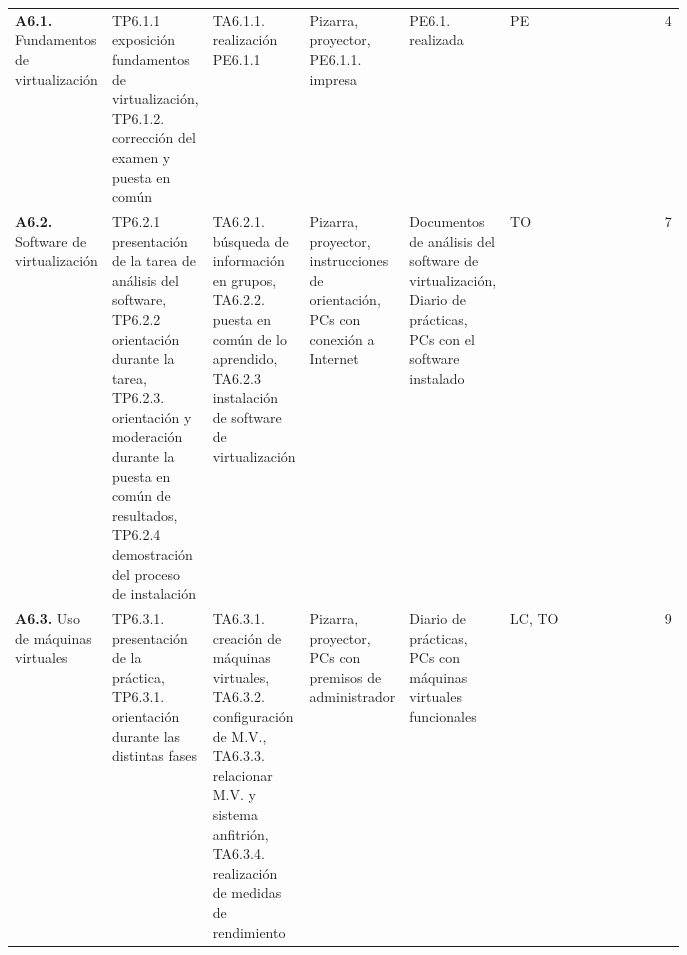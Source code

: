 \begin{landscape}
\begin{tabularx}{\linewidth}{p{0.13\linewidth} p{0.13\linewidth} p{0.13\linewidth} p{0.13\linewidth} p{0.13\linewidth} p{0.13\linewidth} r}
        \textbf{A6.1.} Fundamentos de virtualización & TP6.1.1 exposición fundamentos de virtualización, TP6.1.2. corrección del examen y puesta en común & TA6.1.1. realización PE6.1.1  & Pizarra, proyector, PE6.1.1. impresa & PE6.1. realizada & PE & 4 \\
        \textbf{A6.2.} Software de virtualización & TP6.2.1 presentación de la tarea de análisis del software, TP6.2.2 orientación durante la tarea, TP6.2.3. orientación y moderación durante la puesta en común de resultados, TP6.2.4 demostración del proceso de instalación & TA6.2.1. búsqueda de información en grupos, TA6.2.2. puesta en común de lo aprendido, TA6.2.3 instalación de software de virtualización & Pizarra, proyector, instrucciones de orientación, PCs con conexión a Internet & Documentos de análisis del software de virtualización, Diario de prácticas, PCs con el software instalado & TO & 7 \\
        \textbf{A6.3.} Uso de máquinas virtuales & TP6.3.1. presentación de la práctica, TP6.3.1. orientación durante las distintas fases & TA6.3.1. creación de máquinas virtuales, TA6.3.2. configuración de M.V., TA6.3.3. relacionar M.V. y sistema anfitrión, TA6.3.4. realización de medidas de rendimiento & Pizarra, proyector, PCs con premisos de administrador & Diario de prácticas, PCs con máquinas virtuales funcionales & LC, TO & 9 \\ 
        
    \end{tabularx}
    \egroup
\end{landscape}